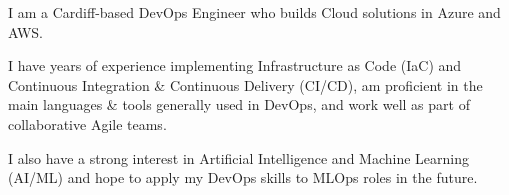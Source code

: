 
\begin{small}

  \vspace{0.25cm}

  I am a Cardiff-based DevOps Engineer who builds Cloud solutions in Azure and AWS.
  \vspace{0.25cm}

  I have years of experience implementing Infrastructure as Code (IaC) and Continuous Integration \& Continuous Delivery (CI/CD), am proficient in the main languages \& tools generally used in DevOps, and work well as part of collaborative Agile teams.
  \vspace{0.25cm}

  I also have a strong interest in Artificial Intelligence and Machine Learning (AI/ML) and hope to apply my DevOps skills to MLOps roles in the future. 

\end{small}
